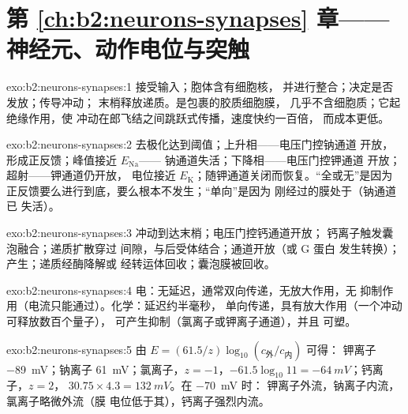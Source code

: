 \section*{第 \ref{ch:b2:neurons-synapses} 章——神经元、动作电位与突触}

\begin{solution}{exo:b2:neurons-synapses:1}
接受输入；胞体含有细胞核，
并进行整合；决定是否发放；传导冲动；
末梢释放递质。是包裹的胶质细胞膜，
几乎不含细胞质；它起绝缘作用，使
冲动在郎飞结之间跳跃式传播，速度快约一百倍，
而成本更低。
\end{solution}

\begin{solution}{exo:b2:neurons-synapses:2}
去极化达到阈值；上升相——电压门控钠通道
开放，形成正反馈；峰值接近 $E_{\mathrm{Na}}$——
钠通道失活；下降相——电压门控钾通道
开放；超射——钾通道仍开放，
电位接近 $E_{\mathrm K}$；随钾通道关闭而恢复。“全或无”是因为
正反馈要么进行到底，要么根本不发生；“单向”是因为
刚经过的膜处于（钠通道已
失活）。
\end{solution}

\begin{solution}{exo:b2:neurons-synapses:3}
冲动到达末梢；电压门控钙通道开放；
钙离子触发囊泡融合；递质扩散穿过
间隙，与后受体结合；通道开放（或 G 蛋白
发生转换）；产生；递质经酶降解或
经转运体回收；囊泡膜被回收。
\end{solution}

\begin{solution}{exo:b2:neurons-synapses:4}
电：无延迟，通常双向传递，无放大作用，无
抑制作用（电流只能通过）。化学：延迟约半毫秒，
单向传递，具有放大作用（一个冲动可释放数百个量子），
可产生抑制（氯离子或钾离子通道），并且
可塑。
\end{solution}

\begin{solution}{exo:b2:neurons-synapses:5}
由 $E = (61.5/z)\log_{10}(c_{\text{外}}/c_{\text{内}})$ 可得：
钾离子 \qty{-89}{mV}；钠离子 \qty{+61}{mV}；氯离子，$z =
-1$，$-61.5\log_{10} 11 = \qty{-64}{mV}$；钙离子，$z = 2$，
$30.75\times 4.3 = \qty{+132}{mV}$。在 \qty{-70}{mV} 时：
钾离子外流，钠离子内流，氯离子略微外流（膜
电位低于其），钙离子强烈内流。
\end{solution}

